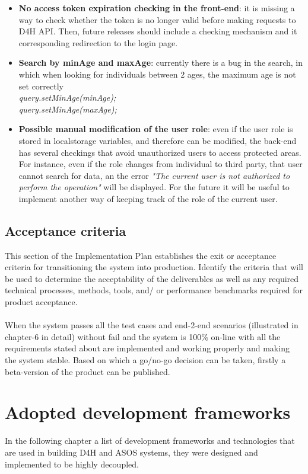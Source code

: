 \documentclass[a4paper, hidelinks, 12pt]{report}
\begin{document}
\begin{itemize}
	\item \textbf{No access token expiration checking in the front-end}: it is missing a way to check whether the token is no longer valid before making requests to D4H API. Then, future releases should include a checking mechanism and it corresponding redirection to the login page.

	\item \textbf{Search by minAge and maxAge}: currently there is a bug in the search, in which when looking for individuals between 2 ages, the maximum age is not set correctly \\ 
		   \textit{query.setMinAge(minAge);} \\
			\textit{query.setMinAge(maxAge);}
	
	\item \textbf{Possible manual modification of the user role}: even if the user role is stored in localstorage variables, and therefore can be modified, the back-end has several checkings that avoid unauthorized users to access protected areas. For instance, even if the role changes from individual to third party, that user cannot search for data, an the error 
	\textit{"The current user is not authorized to perform the operation" } will be displayed. For the future it will be useful to implement another way of keeping track of the role of the current user.
\end{itemize}

\section{Acceptance criteria}
This section of the Implementation Plan establishes the exit or acceptance criteria for transitioning the system into production. Identify the criteria that will be used to determine the acceptability of the deliverables as well as any required technical processes, methods, tools, and/ or performance benchmarks required for product acceptance. \\\\
When the system passes all the test cases and end-2-end scenarios (illustrated in chapter-6 in detail) without fail and the system is 100\% on-line with all the requirements stated about are implemented and working properly and making the system stable. Based on which a go/no-go decision can be taken, firstly a beta-version of the product can be published.

	\chapter{Adopted development frameworks}
In the following chapter a list of development frameworks and technologies that are used in building  D4H and ASOS systems, they were designed and implemented to be highly decoupled.
\end{document}
